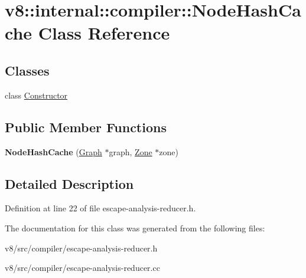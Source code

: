 \hypertarget{classv8_1_1internal_1_1compiler_1_1NodeHashCache}{}\section{v8\+:\+:internal\+:\+:compiler\+:\+:Node\+Hash\+Cache Class Reference}
\label{classv8_1_1internal_1_1compiler_1_1NodeHashCache}
\subsection*{Classes}
\begin{DoxyCompactItemize}
\item 
class \mbox{\hyperlink{classv8_1_1internal_1_1compiler_1_1NodeHashCache_1_1Constructor}{Constructor}}
\end{DoxyCompactItemize}
\subsection*{Public Member Functions}
\begin{DoxyCompactItemize}
\item 
\mbox{\label{classv8_1_1internal_1_1compiler_1_1NodeHashCache_a7b130168df22c37ac7aee6792409e3a1}} 
{\bfseries Node\+Hash\+Cache} (\mbox{\hyperlink{classv8_1_1internal_1_1compiler_1_1Graph}{Graph}} $\ast$graph, \mbox{\hyperlink{classv8_1_1internal_1_1Zone}{Zone}} $\ast$zone)
\end{DoxyCompactItemize}


\subsection{Detailed Description}


Definition at line 22 of file escape-\/analysis-\/reducer.\+h.



The documentation for this class was generated from the following files\+:\begin{DoxyCompactItemize}
\item 
v8/src/compiler/escape-\/analysis-\/reducer.\+h\item 
v8/src/compiler/escape-\/analysis-\/reducer.\+cc\end{DoxyCompactItemize}
